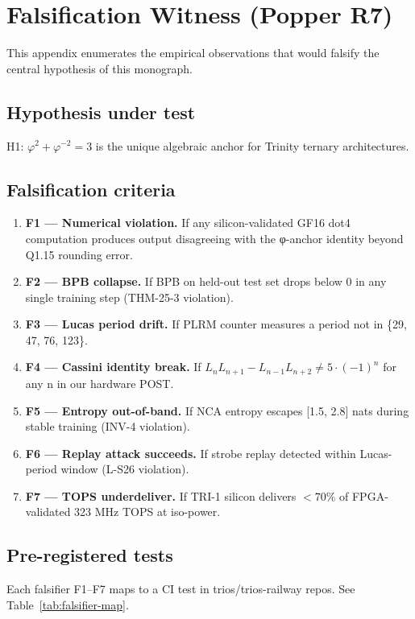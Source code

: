 \chapter{Falsification Witness (Popper R7)}
\label{app:popper}

This appendix enumerates the empirical observations that would falsify
the central hypothesis of this monograph.

\section{Hypothesis under test}
H1: \(\varphi^2 + \varphi^{-2} = 3\) is the unique algebraic anchor for
Trinity ternary architectures.

\section{Falsification criteria}
\begin{enumerate}
  \item \textbf{F1 — Numerical violation.} If any silicon-validated GF16
        dot4 computation produces output disagreeing with the φ-anchor
        identity beyond Q1.15 rounding error.
  \item \textbf{F2 — BPB collapse.} If BPB on held-out test set drops
        below 0 in any single training step (THM-25-3 violation).
  \item \textbf{F3 — Lucas period drift.} If PLRM counter measures a
        period not in \{29, 47, 76, 123\}.
  \item \textbf{F4 — Cassini identity break.} If \(L_n L_{n+1} - L_{n-1}
        L_{n+2} \neq 5 \cdot (-1)^n\) for any n in our hardware POST.
  \item \textbf{F5 — Entropy out-of-band.} If NCA entropy escapes
        [1.5, 2.8] nats during stable training (INV-4 violation).
  \item \textbf{F6 — Replay attack succeeds.} If strobe replay detected
        within Lucas-period window (L-S26 violation).
  \item \textbf{F7 — TOPS underdeliver.} If TRI-1 silicon delivers
        \(<70\%\) of FPGA-validated 323 MHz TOPS at iso-power.
\end{enumerate}

\section{Pre-registered tests}
Each falsifier F1–F7 maps to a CI test in trios/trios-railway repos.
See Table~\ref{tab:falsifier-map}.


